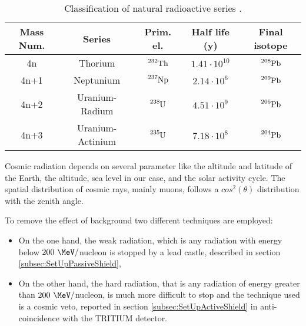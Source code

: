 \begin{table}[htbp]
\begin{center}
\begin{tabular}{|c|c|c|c|c|}
\hline
Mass Num. & Series & Prim. el. & Half life (y) & Final isotope \\
\hline \hline \hline
4n & Thorium & $\ce{^{232}Th}$ & $1.41 \cdot{} 10^{10}$ & $\ce{^{208}Pb}$ \\ \hline
4n+1 & Neptunium & $\ce{^{237}Np}$ & $2.14 \cdot{} 10^{6}$ & $\ce{^{209}Pb}$ \\ \hline
4n+2 & Uranium-Radium & $\ce{^{238}U}$ & $4.51 \cdot{} 10^{9}$ & $\ce{^{206}Pb}$ \\ \hline
4n+3 & Uranium-Actinium & $\ce{^{235}U}$ & $7.18 \cdot{} 10^{8}$ & $\ce{^{204}Pb}$ \\ \hline
\end{tabular}
\caption{Classification of natural radioactive series \cite{NaturalRadioactiveSeries1, NaturalRadioactiveSeries2}.}
\label{tab:NaturalRadioactiveSeries}
\end{center}
\end{table}

Cosmic radiation depends on several parameter like the altitude and latitude of the Earth, the altitude, sea level in our case, and the solar activity cycle. The spatial distribution of cosmic rays, mainly muons, follows a $cos^2(\theta)$ distribution with the zenith angle. %

To remove the effect of background two different techniques are employed:

\begin{itemize}

\item{}  On the one hand, the weak radiation, which is any radiation with energy below $200~\MeV/$nucleon is stopped by a lead castle, described in section \ref{subsec:SetUpPassiveShield},

\item{} On the other hand, the hard radiation, that is any radiation of energy greater than $200~\MeV/$nucleon, is much more difficult to stop and the technique used is a cosmic veto, reported in section \ref{subsec:SetUpActiveShield} in anti-coincidence with the TRITIUM detector. %

\end{itemize}